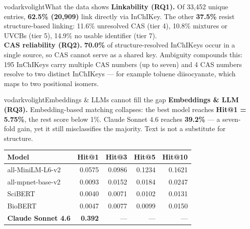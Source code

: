 \documentclass[final]{beamer}
\newlength{\colh}
\newcommand{\figcap}[1]{\vspace{2mm}{\footnotesize\itshape #1}\vspace{2mm}}
\begin{document}
\begin{frame}[t]
\begin{columns}[t,onlytextwidth]
\begin{column}{0.315\textwidth}
\begin{minipage}[t][\colh][s]{\linewidth}
\rule{0pt}{0pt}%
\begin{pbox}{vodark}{volight}{What the data shows}
  \justifying
  \textbf{Linkability (RQ1).} Of 33,452 unique entries, \textbf{62.5\%
  (20,909)} link directly via InChIKey. The other \textbf{37.5\%} resist
  structure-based linking: 11.6\% unresolved CAS (tier 4), 10.8\% mixtures or
  UVCBs (tier 5), 14.9\% no usable identifier (tier 7).\\[5mm]
  \textbf{CAS reliability (RQ2).} \textbf{70.0\%} of structure-resolved
  InChIKeys occur in a single source, so CAS cannot serve as a shared key.
  Ambiguity compounds this: 195 InChIKeys carry multiple CAS numbers (up to
  seven) and 4 CAS numbers resolve to two distinct InChIKeys --- for example
  toluene diisocyanate, which maps to two positional isomers.
\end{pbox}

\vfill
\begin{pbox}{vodark}{volight}{Embeddings \& LLMs cannot fill the gap}
  \justifying
  \textbf{Embeddings \& LLM (RQ3).} Embedding-based matching collapses: the best model reaches \textbf{Hit@1 =
  5.75\%}, the rest score below 1\%. Claude Sonnet 4.6 reaches \textbf{39.2\%}
  --- a seven-fold gain, yet it still misclassifies the majority. Text is not a
  substitute for structure.
  
\end{pbox}

{\centering
\begin{tabular}{@{}l r r r r@{}}
\toprule
\textbf{Model} & \textbf{Hit@1} & \textbf{Hit@3} & \textbf{Hit@5} & \textbf{Hit@10}\\
\midrule
all-MiniLM-L6-v2  & 0.0575 & 0.0986 & 0.1234 & 0.1621\\
all-mpnet-base-v2 & 0.0093 & 0.0152 & 0.0184 & 0.0247\\
SciBERT           & 0.0040 & 0.0071 & 0.0102 & 0.0131\\
BioBERT           & 0.0047 & 0.0077 & 0.0099 & 0.0150\\
\textbf{Claude Sonnet 4.6} & \textbf{0.392} & --- & --- & ---\\
\bottomrule
\end{tabular}\par}
\figcap{ChemOnt classification, direct-parent level. Only Hit@1 is comparable
across rows; ground truth is 28,204 ClassyFire assignments (structure-linked entries).}




\end{minipage}
\end{column}
\end{columns}
\end{frame}
\end{document}
